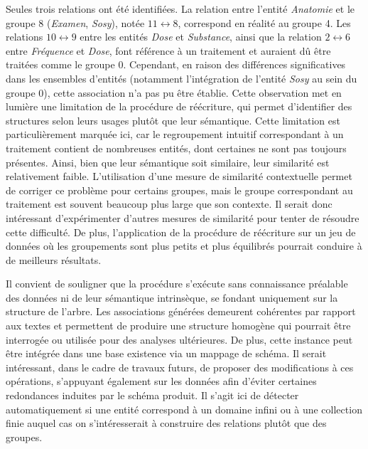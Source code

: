 Seules trois relations ont été identifiées.
La relation entre l'entité \emph{Anatomie} et le groupe 8 (\emph{Examen}, \emph{Sosy}), notée $11 \leftrightarrow 8$, correspond en réalité au groupe 4.
Les relations $10 \leftrightarrow 9$ entre les entités \emph{Dose} et \emph{Substance}, ainsi que la relation $2 \leftrightarrow 6$ entre \emph{Fréquence} et \emph{Dose}, font référence à un traitement et auraient dû être traitées comme le groupe 0.
Cependant, en raison des différences significatives dans les ensembles d'entités (notamment l'intégration de l'entité \emph{Sosy} au sein du groupe 0), cette association n'a pas pu être établie.
Cette observation met en lumière une limitation de la procédure de réécriture, qui permet d'identifier des structures selon leurs usages plutôt que leur sémantique.
Cette limitation est particulièrement marquée ici, car le regroupement intuitif correspondant à un traitement contient de nombreuses entités, dont certaines ne sont pas toujours présentes.
Ainsi, bien que leur sémantique soit similaire, leur similarité est relativement faible.
L'utilisation d'une mesure de similarité contextuelle permet de corriger ce problème pour certains groupes, mais le groupe correspondant au traitement est souvent beaucoup plus large que son contexte.
Il serait donc intéressant d'expérimenter d'autres mesures de similarité pour tenter de résoudre cette difficulté.
De plus, l'application de la procédure de réécriture sur un jeu de données où les groupements sont plus petits et plus équilibrés pourrait conduire à de meilleurs résultats.

Il convient de souligner que la procédure s'exécute sans connaissance préalable des données ni de leur sémantique intrinsèque, se fondant uniquement sur la structure de l'arbre.
Les associations générées demeurent cohérentes par rapport aux textes et permettent de produire une structure homogène qui pourrait être interrogée ou utilisée pour des analyses ultérieures.
De plus, cette instance peut être intégrée dans une base existence via un mappage de schéma.
Il serait intéressant, dans le cadre de travaux futurs, de proposer des modifications à ces opérations, s'appuyant également sur les données afin d'éviter certaines redondances induites par le schéma produit.
Il s'agit ici de détecter automatiquement si une entité correspond à un domaine infini ou à une collection finie auquel cas on s'intéresserait à construire des relations plutôt que des groupes.

